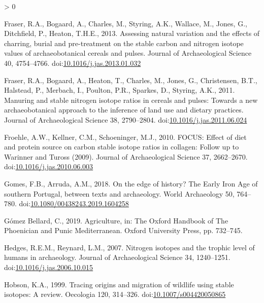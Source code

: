 \documentclass[5p]{elsarticle} %
\newlength{\cslhangindent}
\newenvironment{CSLReferences}[2] %
 {%
  \setlength{\parindent}{0pt}
  \ifodd #1 \everypar{\setlength{\hangindent}{\cslhangindent}}\ignorespaces\fi
  \ifnum #2 > 0
  \setlength{\parskip}{#2\baselineskip}
  \fi
 }%
 {}
\begin{document}
\begin{CSLReferences}{1}{0}
\leavevmode\hypertarget{ref-fraser_etal13a}{}%
Fraser, R.A., Bogaard, A., Charles, M., Styring, A.K., Wallace, M., Jones, G., Ditchfield, P., Heaton, T.H.E., 2013. Assessing natural variation and the effects of charring, burial and pre-treatment on the stable carbon and nitrogen isotope values of archaeobotanical cereals and pulses. Journal of Archaeological Science 40, 4754--4766. doi:\href{https://doi.org/10.1016/j.jas.2013.01.032}{10.1016/j.jas.2013.01.032}

\leavevmode\hypertarget{ref-fraser_etal11}{}%
Fraser, R.A., Bogaard, A., Heaton, T., Charles, M., Jones, G., Christensen, B.T., Halstead, P., Merbach, I., Poulton, P.R., Sparkes, D., Styring, A.K., 2011. Manuring and stable nitrogen isotope ratios in cereals and pulses: Towards a new archaeobotanical approach to the inference of land use and dietary practices. Journal of Archaeological Science 38, 2790--2804. doi:\href{https://doi.org/10.1016/j.jas.2011.06.024}{10.1016/j.jas.2011.06.024}

\leavevmode\hypertarget{ref-froehle_etal10}{}%
Froehle, A.W., Kellner, C.M., Schoeninger, M.J., 2010. {FOCUS}: Effect of diet and protein source on carbon stable isotope ratios in collagen: Follow up to {Warinner} and {Tuross} (2009). Journal of Archaeological Science 37, 2662--2670. doi:\href{https://doi.org/10.1016/j.jas.2010.06.003}{10.1016/j.jas.2010.06.003}

\leavevmode\hypertarget{ref-gomes_arruda18}{}%
Gomes, F.B., Arruda, A.M., 2018. On the edge of history? {The Early Iron Age} of southern {Portugal}, between texts and archaeology. World Archaeology 50, 764--780. doi:\href{https://doi.org/10.1080/00438243.2019.1604258}{10.1080/00438243.2019.1604258}

\leavevmode\hypertarget{ref-gomezbellard19}{}%
Gómez Bellard, C., 2019. Agriculture, in: The {Oxford Handbook} of {The Phoenician} and {Punic Mediterranean}. {Oxford University Press}, pp. 732--745.

\leavevmode\hypertarget{ref-hedges_reynard07}{}%
Hedges, R.E.M., Reynard, L.M., 2007. Nitrogen isotopes and the trophic level of humans in archaeology. Journal of Archaeological Science 34, 1240--1251. doi:\href{https://doi.org/10.1016/j.jas.2006.10.015}{10.1016/j.jas.2006.10.015}

\leavevmode\hypertarget{ref-hobson99}{}%
Hobson, K.A., 1999. Tracing origins and migration of wildlife using stable isotopes: A review. Oecologia 120, 314--326. doi:\href{https://doi.org/10.1007/s004420050865}{10.1007/s004420050865}


\end{CSLReferences}
\end{document}
